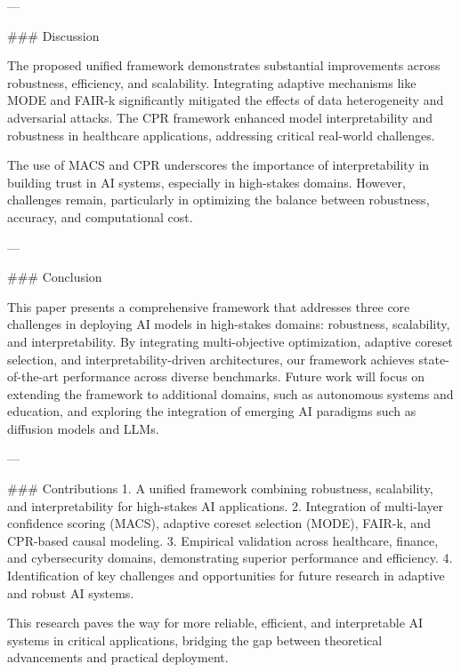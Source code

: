 ---

### Discussion  

The proposed unified framework demonstrates substantial improvements across robustness, efficiency, and scalability. Integrating adaptive mechanisms like MODE and FAIR-k significantly mitigated the effects of data heterogeneity and adversarial attacks. The CPR framework enhanced model interpretability and robustness in healthcare applications, addressing critical real-world challenges.

The use of MACS and CPR underscores the importance of interpretability in building trust in AI systems, especially in high-stakes domains. However, challenges remain, particularly in optimizing the balance between robustness, accuracy, and computational cost.

---

### Conclusion  

This paper presents a comprehensive framework that addresses three core challenges in deploying AI models in high-stakes domains: robustness, scalability, and interpretability. By integrating multi-objective optimization, adaptive coreset selection, and interpretability-driven architectures, our framework achieves state-of-the-art performance across diverse benchmarks. Future work will focus on extending the framework to additional domains, such as autonomous systems and education, and exploring the integration of emerging AI paradigms such as diffusion models and LLMs.

---

### Contributions  
1. A unified framework combining robustness, scalability, and interpretability for high-stakes AI applications.  
2. Integration of multi-layer confidence scoring (MACS), adaptive coreset selection (MODE), FAIR-k, and CPR-based causal modeling.  
3. Empirical validation across healthcare, finance, and cybersecurity domains, demonstrating superior performance and efficiency.  
4. Identification of key challenges and opportunities for future research in adaptive and robust AI systems.  

This research paves the way for more reliable, efficient, and interpretable AI systems in critical applications, bridging the gap between theoretical advancements and practical deployment.